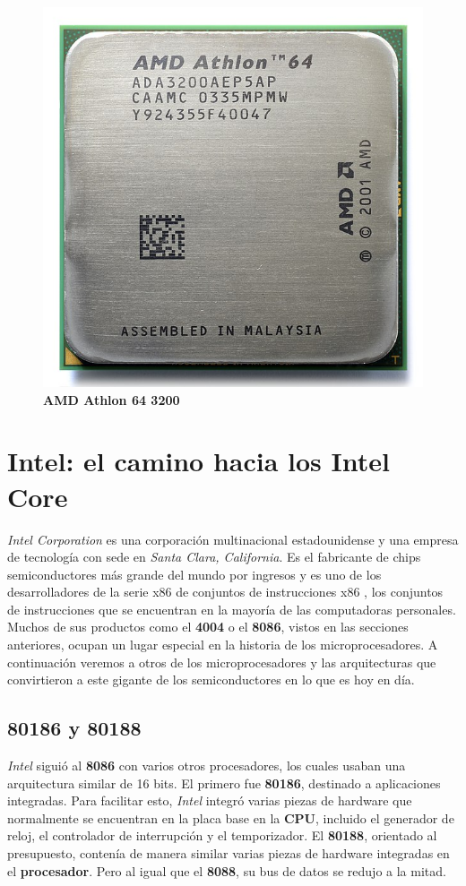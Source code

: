 \begin{figure}[htb]
	\centering
	\includegraphics[scale = 0.15]{Graphics/AMD_Athlon_64_3200+_ADA3200AEP5AP.jpg}
	\caption{\textbf{AMD Athlon 64 3200}}
	\label{fig:20}
\end{figure}
\newpage
\section{Intel: el camino hacia los Intel Core}
\emph{Intel Corporation} es una corporación multinacional estadounidense y una empresa de tecnología con sede en \emph{Santa Clara, California}. 
Es el fabricante de chips semiconductores más grande del mundo por ingresos y es uno de los desarrolladores de la serie x86 
de conjuntos de instrucciones x86 , los conjuntos de instrucciones que se encuentran en la mayoría de las 
computadoras personales. Muchos de sus productos como el \textbf{4004} o el \textbf{8086}, vistos en las secciones anteriores, ocupan un lugar especial 
en la historia de los microprocesadores. A continuación veremos a otros de los microprocesadores y las arquitecturas que convirtieron 
a este gigante de los semiconductores en lo que es hoy en día.\

\subsection{\textbf{80186} y \textbf{80188}}
\emph{Intel} siguió al \textbf{8086} con varios otros procesadores, los cuales usaban una arquitectura similar de 16 bits. El primero fue \textbf{80186}, 
destinado a aplicaciones integradas. Para facilitar esto, \emph{Intel} integró varias piezas de hardware que normalmente se encuentran en la 
placa base en la \textbf{CPU}, incluido el generador de reloj, el controlador de interrupción y el temporizador. El \textbf{80188}, orientado al presupuesto, 
contenía de manera similar varias piezas de hardware integradas en el \textbf{procesador}. Pero al igual que el \textbf{8088}, su bus de datos se redujo a la 
mitad.

